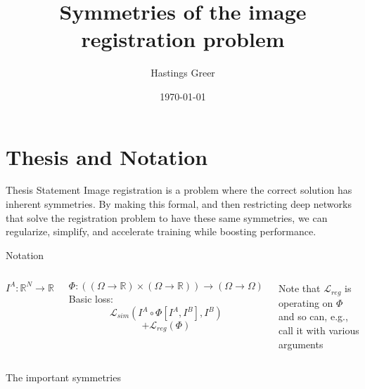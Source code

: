 \documentclass{beamer}
\title{Symmetries of the image registration problem}
\author{Hastings Greer}
\date{\today}
\begin{document}
\begin{frame}
    \titlepage
\end{frame}

\section{Thesis and Notation}

\begin{frame}{Thesis Statement}
Image registration is a problem where the correct solution has inherent symmetries. By making this formal, and then restricting deep networks that solve the registration problem to have these same symmetries, we can regularize, simplify, and accelerate training while boosting performance.
\end{frame}

\begin{frame}{Notation}
    \begin{columns}
	    $$I^A: \mathbb{R}^N \rightarrow \mathbb{R} $$

$$\Phi:
	\left( (\Omega \rightarrow \mathbb{R}) \times (\Omega \rightarrow \mathbb{R})
	\right) \rightarrow (\Omega \rightarrow \Omega) $$
	Basic loss:
	    $$ \mathcal{L}_{sim}(I^A \circ \Phi[I^A, I^B], I^B) $$
	    $$+ \mathcal{L}_{reg}(\Phi)$$

	    Note that $\mathcal{L}_{reg}$ is operating on $\Phi$ and so can, e.g., call it with various arguments
    \end{columns}
\end{frame}

\begin{frame}{The important symmetries}
\end{frame}
\end{document}
